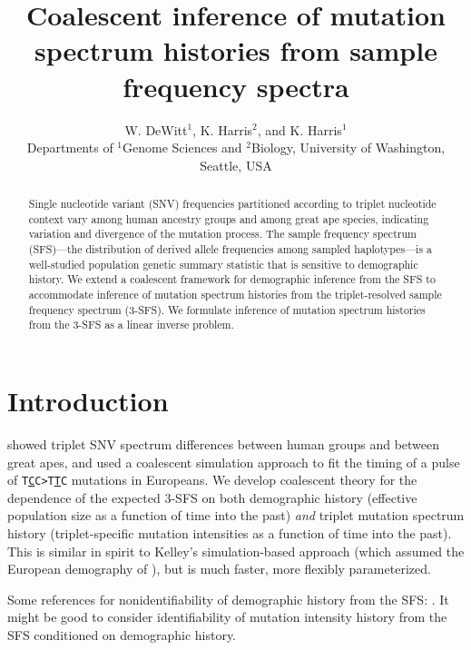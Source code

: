 \documentclass[11pt]{article}
\title{Coalescent inference of mutation spectrum histories from sample frequency spectra}
\author{
W. DeWitt$^{1}$, K. Harris$^{2}$, and K. Harris$^{1}$\\
\small{Departments of $^1$Genome Sciences and $^2$Biology, University of Washington, Seattle, USA}
}
\begin{document}
\maketitle

\begin{abstract}

Single nucleotide variant (SNV) frequencies partitioned according to triplet nucleotide context vary among human ancestry groups and among great ape species, indicating variation and divergence of the mutation process.
The sample frequency spectrum (SFS)---the distribution of derived allele frequencies among sampled haplotypes---is a well-studied population genetic summary statistic that is sensitive to demographic history.
We extend a coalescent framework for demographic inference from the SFS to accommodate inference of mutation spectrum histories from the triplet-resolved sample frequency spectrum (3-SFS).
We formulate inference of mutation spectrum histories from the 3-SFS as a linear inverse problem.

\end{abstract}


\section{Introduction}\label{sec:intro}

\cite{Harris2017-fw} showed triplet SNV spectrum differences between human groups and between great apes, and used a coalescent simulation approach to fit the timing of a pulse of \texttt{T\underline{C}C>T\underline{T}C} mutations in Europeans.
We develop coalescent theory for the dependence of the expected 3-SFS on both demographic history (effective population size as a function of time into the past) \emph{and} triplet mutation spectrum history (triplet-specific mutation intensities as a function of time into the past).
This is similar in spirit to Kelley's simulation-based approach (which assumed the European demography of \cite{Tennessen2012-dq}), but is much faster, more flexibly parameterized.

Some references for nonidentifiability of demographic history from the SFS: \cite{Baharian2018-np, Bhaskar2014-fu, Terhorst2015-xt, Myers2008-jp}.
It might be good to consider identifiability of mutation intensity history from the SFS conditioned on demographic history.

\end{document}
